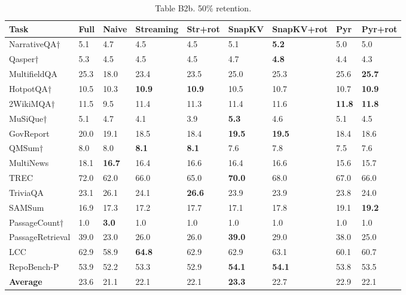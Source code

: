 \documentclass[10pt,letterpaper]{article}
\begin{document}
\begin{table}[H]
\centering
\small
\caption*{Table B2b. 50\% retention.}
\begin{tabular}{@{}lllllllll@{}}
\toprule
Task & Full & Naive & Streaming & Str+rot & SnapKV & SnapKV+rot & Pyr &
Pyr+rot\\
\midrule
    NarrativeQA† & 5.1 & 4.7 & 4.5 & 4.5 & 5.1 & \textbf{5.2} & 5.0 & 5.0\\
    Qasper† & 5.3 & 4.5 & 4.5 & 4.5 & 4.7 & \textbf{4.8} & 4.4 & 4.3\\
    MultifieldQA & 25.3 & 18.0 & 23.4 & 23.5 & 25.0 & 25.3 & 25.6 & \textbf{25.7}\\
    HotpotQA† & 10.5 & 10.3 & \textbf{10.9} & \textbf{10.9} & 10.5 & 10.7 & 10.7 & \textbf{10.9}\\
    2WikiMQA† & 11.5 & 9.5 & 11.4 & 11.3 & 11.4 & 11.6 & \textbf{11.8} & \textbf{11.8}\\
    MuSiQue† & 5.1 & 4.7 & 4.1 & 3.9 & \textbf{5.3} & 4.6 & 5.1 & 4.5\\
    GovReport & 20.0 & 19.1 & 18.5 & 18.4 & \textbf{19.5} & \textbf{19.5} & 18.4 & 18.6\\
    QMSum† & 8.0 & 8.0 & \textbf{8.1} & \textbf{8.1} & 7.6 & 7.8 & 7.5 & 7.6\\
    MultiNews & 18.1 & \textbf{16.7} & 16.4 & 16.6 & 16.4 & 16.6 & 15.6 & 15.7\\
    TREC & 72.0 & 62.0 & 66.0 & 65.0 & \textbf{70.0} & 68.0 & 67.0 & 66.0\\
    TriviaQA & 23.1 & 26.1 & 24.1 & \textbf{26.6} & 23.9 & 23.9 & 23.8 & 24.0\\
    SAMSum & 16.9 & 17.3 & 17.2 & 17.7 & 17.1 & 17.8 & 19.1 & \textbf{19.2}\\
    PassageCount† & 1.0 & \textbf{3.0} & 1.0 & 1.0 & 1.0 & 1.0 & 1.0 & 1.0\\
    PassageRetrieval & 39.0 & 23.0 & 26.0 & 26.0 & \textbf{39.0} & 29.0 & 38.0 & 25.0\\
    LCC & 62.9 & 58.9 & \textbf{64.8} & 62.9 & 62.9 & 63.1 & 60.1 & 60.7\\
    RepoBench-P & 53.9 & 52.2 & 53.3 & 52.9 & \textbf{54.1} & \textbf{54.1} & 53.8 & 53.5\\
    \textbf{Average} & 23.6 & 21.1 & 22.1 & 22.1 & \textbf{23.3} & 22.7 & 22.9 & 22.1\\
\bottomrule
\end{tabular}
\end{table}
\end{document}
